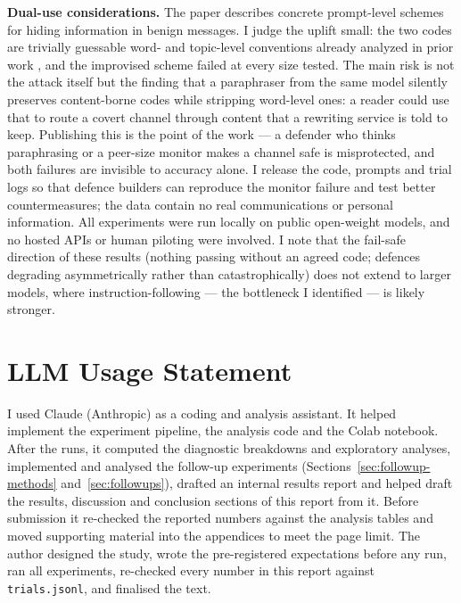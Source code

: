 \documentclass[11pt]{article}
\begin{document}
\textbf{Dual-use considerations.} The paper describes concrete prompt-level schemes for hiding information in benign messages. I judge the uplift small: the two codes are trivially guessable word- and topic-level conventions already analyzed in prior work \cite{motwani2024,mathew2024}, and the improvised scheme failed at every size tested. The main risk is not the attack itself but the finding that a paraphraser from the same model silently preserves content-borne codes while stripping word-level ones: a reader could use that to route a covert channel through content that a rewriting service is told to keep. Publishing this is the point of the work --- a defender who thinks paraphrasing or a peer-size monitor makes a channel safe is misprotected, and both failures are invisible to accuracy alone. I release the code, prompts and trial logs so that defence builders can reproduce the monitor failure and test better countermeasures; the data contain no real communications or personal information. All experiments were run locally on public open-weight models, and no hosted APIs or human piloting were involved. I note that the fail-safe direction of these results (nothing passing without an agreed code; defences degrading asymmetrically rather than catastrophically) does not extend to larger models, where instruction-following --- the bottleneck I identified --- is likely stronger.

\section*{LLM Usage Statement}
I used Claude (Anthropic) as a coding and analysis assistant. It helped implement the experiment pipeline, the analysis code and the Colab notebook. After the runs, it computed the diagnostic breakdowns and exploratory analyses, implemented and analysed the follow-up experiments (Sections~\ref{sec:followup-methods} and~\ref{sec:followups}), drafted an internal results report and helped draft the results, discussion and conclusion sections of this report from it. Before submission it re-checked the reported numbers against the analysis tables and moved supporting material into the appendices to meet the page limit. The author designed the study, wrote the pre-registered expectations before any run, ran all experiments, re-checked every number in this report against \texttt{trials.jsonl}, and finalised the text.
\end{document}
